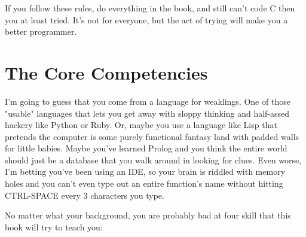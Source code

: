 If you follow these rules, do everything in the book, and still can't
code C then you at least tried.  It's not for everyone, but the act
of trying will make you a better programmer.

\section*{The Core Competencies}

I'm going to guess that you come from a language for weaklings.  One of those
"usable" languages that lets you get away with sloppy thinking and half-assed
hackery like Python or Ruby.  Or, maybe you use a language like Lisp that pretends the
computer is some purely functional fantasy land with padded walls for little babies.
Maybe you've learned Prolog and you think the entire world should just be a database
that you walk around in looking for clues.  Even worse, I'm betting you've been
using an IDE, so your brain is riddled with memory holes and you can't even
type out an entire function's name without hitting CTRL-SPACE every 3 characters
you type.

No matter what your background, you are probably bad at four skill that this
book will try to teach you:

